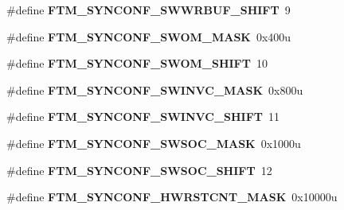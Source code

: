\begin{DoxyCompactItemize}
\item 
\#define {\bfseries F\+T\+M\+\_\+\+S\+Y\+N\+C\+O\+N\+F\+\_\+\+S\+W\+W\+R\+B\+U\+F\+\_\+\+S\+H\+I\+FT}~9\hypertarget{group__FTM__Register__Masks_ga7e637f85f9c1208956b53b41549e7d87}{}\label{group__FTM__Register__Masks_ga7e637f85f9c1208956b53b41549e7d87}

\item 
\#define {\bfseries F\+T\+M\+\_\+\+S\+Y\+N\+C\+O\+N\+F\+\_\+\+S\+W\+O\+M\+\_\+\+M\+A\+SK}~0x400u\hypertarget{group__FTM__Register__Masks_ga83a5f269c2d4504f783db9f73465447c}{}\label{group__FTM__Register__Masks_ga83a5f269c2d4504f783db9f73465447c}

\item 
\#define {\bfseries F\+T\+M\+\_\+\+S\+Y\+N\+C\+O\+N\+F\+\_\+\+S\+W\+O\+M\+\_\+\+S\+H\+I\+FT}~10\hypertarget{group__FTM__Register__Masks_ga2e240c4c97396948369a13ec27c0f038}{}\label{group__FTM__Register__Masks_ga2e240c4c97396948369a13ec27c0f038}

\item 
\#define {\bfseries F\+T\+M\+\_\+\+S\+Y\+N\+C\+O\+N\+F\+\_\+\+S\+W\+I\+N\+V\+C\+\_\+\+M\+A\+SK}~0x800u\hypertarget{group__FTM__Register__Masks_ga6b91d1ec9cfd8e992734eab0b764fa50}{}\label{group__FTM__Register__Masks_ga6b91d1ec9cfd8e992734eab0b764fa50}

\item 
\#define {\bfseries F\+T\+M\+\_\+\+S\+Y\+N\+C\+O\+N\+F\+\_\+\+S\+W\+I\+N\+V\+C\+\_\+\+S\+H\+I\+FT}~11\hypertarget{group__FTM__Register__Masks_ga1b9db3f75907123978450cf63605621b}{}\label{group__FTM__Register__Masks_ga1b9db3f75907123978450cf63605621b}

\item 
\#define {\bfseries F\+T\+M\+\_\+\+S\+Y\+N\+C\+O\+N\+F\+\_\+\+S\+W\+S\+O\+C\+\_\+\+M\+A\+SK}~0x1000u\hypertarget{group__FTM__Register__Masks_ga33a4f7326defaab9414315649e467ff5}{}\label{group__FTM__Register__Masks_ga33a4f7326defaab9414315649e467ff5}

\item 
\#define {\bfseries F\+T\+M\+\_\+\+S\+Y\+N\+C\+O\+N\+F\+\_\+\+S\+W\+S\+O\+C\+\_\+\+S\+H\+I\+FT}~12\hypertarget{group__FTM__Register__Masks_gaabae406b076dd71660d85bef42d47fb1}{}\label{group__FTM__Register__Masks_gaabae406b076dd71660d85bef42d47fb1}

\item 
\#define {\bfseries F\+T\+M\+\_\+\+S\+Y\+N\+C\+O\+N\+F\+\_\+\+H\+W\+R\+S\+T\+C\+N\+T\+\_\+\+M\+A\+SK}~0x10000u\hypertarget{group__FTM__Register__Masks_gaea9636cc8049be6d3d952dc343d34185}{}\label{group__FTM__Register__Masks_gaea9636cc8049be6d3d952dc343d34185}


\end{DoxyCompactItemize}
